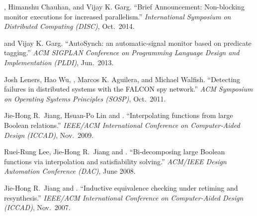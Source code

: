

\begin{myenumerate}
    \item {}, Himanshu Chauhan, and Vijay K. Garg. ``Brief
        Announcement: Non-blocking monitor executions for increased
        parallelism.'' {\it International Symposium on Distributed Computing (DISC)},
        Oct.~2014. 
    \item {} and Vijay K. Garg. ``AutoSynch: an
        automatic-signal monitor based on predicate tagging.'' {\it ACM SIGPLAN
        Conference on Programming Language Design and Implementation (PLDI)},
        Jun.~2013. 
    \item Josh Leners, Hao Wu, , Marcos K. Aguilera, and 
        Michael Walfish. ``Detecting failures in distributed systems with the 
        FALCON spy network.'' {\it ACM Symposium on Operating Systems 
        Principles (SOSP)}, Oct.~2011.
    \item Jie-Hong R.~Jiang, Hsuan-Po Lin and  .
        ``Interpolating functions from large Boolean relations.'' {\it  
        IEEE/ACM International Conference on Computer-Aided Design (ICCAD)},  
        Nov.~2009.
    \item Ruei-Rung Lee, Jie-Hong R.~Jiang and . 
        ``Bi-decomposing large Boolean functions via interpolation and 
        satisfiability solving.'' {\it ACM/IEEE Design Automation Conference 
        (DAC)}, June 2008. %
    \item Jie-Hong R.~Jiang and . ``Inductive equivalence 
        checking under retiming and resynthesis.'' {\it IEEE/ACM International 
        Conference on Computer-Aided Design (ICCAD)}, Nov.~2007.
\end{myenumerate}
